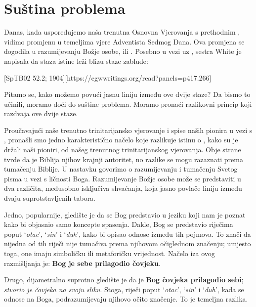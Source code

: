 \chapter{Suština problema}

Danas, kada uspoređujemo naša trenutna Osnovna Vjerovanja s prethodnim , vidimo promjenu u temeljima vjere Adventista Sedmog Dana. Ova promjena se dogodila u razumijevanju Božje osobe, ili . Posebno u vezi uz , sestra White je napisala da staza istine leži blizu staze zablude:

[SpTB02 52.2; 1904][https://egwwritings.org/read?panels=p417.266]

Pitamo se, kako možemo povući jasnu liniju između ove dvije staze? Da bismo to učinili, moramo doći do suštine problema. Moramo pronaći razlikovni princip koji razdvaja ove dvije staze.

Proučavajući naše trenutno trinitarijansko vjerovanje i spise naših pionira u vezi s , pronašli smo jedno karakteristično načelo koje razlikuje istinu o , kako su je držali naši pioniri, od našeg trenutnog trinitarijanskog vjerovanja. Obje strane tvrde da je Biblija njihov krajnji autoritet, no razlike se mogu razaznati prema tumačenju Biblije. U nastavku govorimo o razumijevanju i tumačenju Svetog pisma u vezi s ličnosti Boga. Razumijevanje Božje osobe može se predstaviti u dva različita, međusobno isključiva shvaćanja, koja jasno povlače liniju između dvaju suprotstavljenih tabora.

Jedno, popularnije, gledište je da se Bog predstavio u jeziku koji nam je poznat kako bi objasnio samo koncepte spasenja. Dakle, Bog se predstavio riječima poput ‘\textit{otac}’, ‘\textit{sin}’ i ‘\textit{duh}’, kako bi opisao odnose između tih pojmova. To znači da nijedna od tih riječi nije tumačiva prema njihovom očiglednom značenju; umjesto toga, one imaju simboličku ili metaforičku vrijednost. Načelo iza ovog razmišljanja je: \textbf{Bog je sebe prilagodio čovjeku}.

Drugo, dijametralno suprotno gledište je da je \textbf{Bog čovjeka prilagodio sebi}; \textit{stvorio je čovjeka na svoju sliku}. Stoga, riječi poput ‘\textit{otac}’, ‘\textit{sin}’ i ‘\textit{duh}’, kada se odnose na Boga, podrazumijevaju njihovo očito značenje. To je temeljna razlika.

